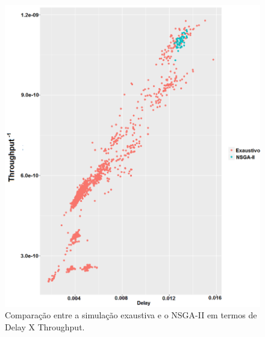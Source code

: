 \documentclass[conference]{IEEEtran}
\begin{document}
\begin{figure}[h]
  \centering
  \includegraphics[scale=0.27]{figures/ExaustivoXNsgaii_DelayXThroughput.png}
  \caption{Comparação entre a simulação exaustiva e o NSGA-II em termos de Delay X Throughput.}
  \label{fig:exaustivo-nsgaii-1}
\end{figure}
\end{document}
